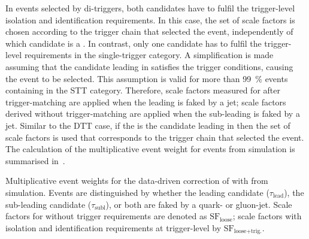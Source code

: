In events selected by di-\tauhadvis triggers, both \tauhadvis
candidates have to fulfil the trigger-level isolation and
identification requirements. In this case, the set of scale factors is
chosen according to the trigger chain that selected the event,
independently of which candidate is a \faketauhadvis. In contrast,
only one \tauhadvis candidate has to fulfil the trigger-level
requirements in the single-\tauhadvis trigger category. A
simplification is made assuming that the \tauhadvis candidate leading
in \pT satisfies the trigger conditions, causing the event to be
selected. This assumption is valid for more than \SI{99}{\percent}
\ttbar events containing \faketauhadvis in the STT
category. Therefore, scale factors measured for \faketauhadvis after
trigger-matching are applied when the leading \tauhadvis is faked by a
jet; scale factors derived without trigger-matching are applied when
the sub-leading \tauhadvis is faked by a jet. Similar to the DTT case,
if the \faketauhadvis is the \tauhadvis candidate leading in \pT then
the set of scale factors is used that corresponds to the trigger chain
that selected the event. The calculation of the multiplicative event
weight for \ttbarFakes events from simulation is summarised
in~.

\begin{table}[htbp]
  \centering

  \caption{Multiplicative event weights for the data-driven correction
    of \ttbar with \faketauhadvis from simulation. Events are
    distinguished by whether the leading \tauhadvis candidate
    ($\tau_{\text{lead}}$), the sub-leading \tauhadvis candidate
    ($\tau_{\text{subl}}$), or both are faked by a quark- or
    gluon-jet. Scale factors for \faketauhadvis without trigger
    requirements are denoted as $\text{SF}_{\text{loose}}$; scale
    factors with isolation and identification requirements at
    trigger-level by $\text{SF}_\text{loose+trig.}$.}%
  \label{tab:ttbarSF_application_rule}

  \resizebox{\textwidth}{!}{
    
  }
\end{table}



